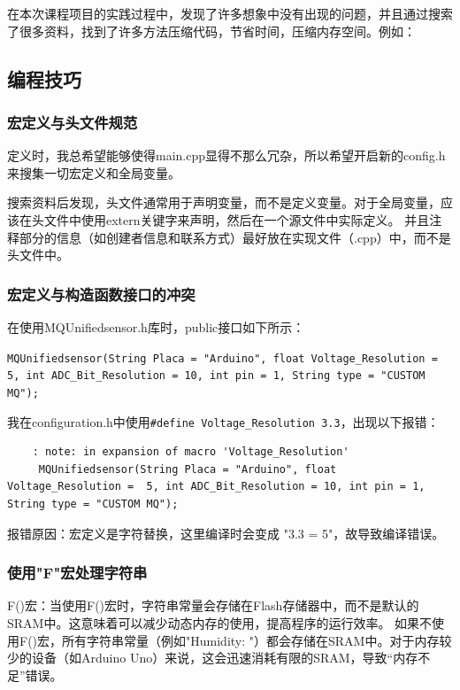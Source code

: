 在本次课程项目的实践过程中，发现了许多想象中没有出现的问题，并且通过搜索了很多资料，找到了许多方法压缩代码，节省时间，压缩内存空间。例如：

\subsection{编程技巧}

\subsubsection{宏定义与头文件规范}

定义时，我总希望能够使得main.cpp显得不那么冗杂，所以希望开启新的config.h来搜集一切宏定义和全局变量。

搜索资料后发现，头文件通常用于声明变量，而不是定义变量。对于全局变量，应该在头文件中使用extern关键字来声明，然后在一个源文件中实际定义。
并且注释部分的信息（如创建者信息和联系方式）最好放在实现文件（.cpp）中，而不是头文件中。

\subsubsection{宏定义与构造函数接口的冲突}

在使用MQUnifiedsensor.h库时，public接口如下所示：

\texttt{MQUnifiedsensor(String Placa = "Arduino", float Voltage\_Resolution =  5, int ADC\_Bit\_Resolution = 10, int pin = 1, String type = "CUSTOM MQ");}

我在configuration.h中使用\texttt{\#define Voltage\_Resolution 3.3}，出现以下报错：

\begin{lstlisting} 
    : note: in expansion of macro 'Voltage_Resolution'
     MQUnifiedsensor(String Placa = "Arduino", float Voltage_Resolution =  5, int ADC_Bit_Resolution = 10, int pin = 1, String type = "CUSTOM MQ");
\end{lstlisting}

报错原因：宏定义是字符替换，这里编译时会变成 "3.3 = 5"，故导致编译错误。

\subsubsection{使用"F"宏处理字符串}

F()宏：当使用F()宏时，字符串常量会存储在Flash存储器中，而不是默认的SRAM中。这意味着可以减少动态内存的使用，提高程序的运行效率。
如果不使用F()宏，所有字符串常量（例如"Humidity: "）都会存储在SRAM中。对于内存较少的设备（如Arduino Uno）来说，这会迅速消耗有限的SRAM，导致“内存不足”错误。


